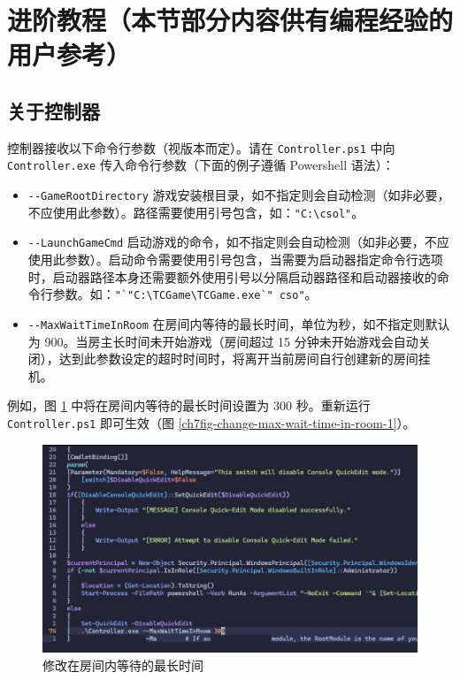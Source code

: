\section{进阶教程（本节部分内容供有编程经验的用户参考）}
\label{section_advanced_usage}

\subsection{关于控制器}

控制器接收以下命令行参数（视版本而定）。请在 \lstinline{Controller.ps1} 中向 \lstinline{Controller.exe} 传入命令行参数（下面的例子遵循 Powershell 语法）：

\begin{itemize}
\item \lstinline{--GameRootDirectory} 游戏安装根目录，如不指定则会自动检测（如非必要，不应使用此参数）。路径需要使用引号包含，如：\lstinline{"C:\csol"}。
\item \lstinline{--LaunchGameCmd} 启动游戏的命令，如不指定则会自动检测（如非必要，不应使用此参数）。启动命令需要使用引号包含，当需要为启动器指定命令行选项时，启动器路径本身还需要额外使用引号以分隔启动器路径和启动器接收的命令行参数。如：\lstinline{"`"C:\TCGame\TCGame.exe`" cso"}。
\item \lstinline{--MaxWaitTimeInRoom} 在房间内等待的最长时间，单位为秒，如不指定则默认为 900。当房主长时间未开始游戏（房间超过 15 分钟未开始游戏会自动关闭），达到此参数设定的超时时间时，将离开当前房间自行创建新的房间挂机。
\end{itemize}

例如，图 \ref{ch7fig-change-max-wait-time-in-room-0} 中将在房间内等待的最长时间设置为 300 秒。重新运行 \lstinline{Controller.ps1} 即可生效（图 \ref{ch7fig-change-max-wait-time-in-room-1}）。

\begin{figure}[H]
    \Centering
    \includegraphics[width=\textwidth]{docs/assets/advanced/change_max_wait_time_in_room_0.png}
    \caption{修改在房间内等待的最长时间}
    \label{ch7fig-change-max-wait-time-in-room-0}
\end{figure}

